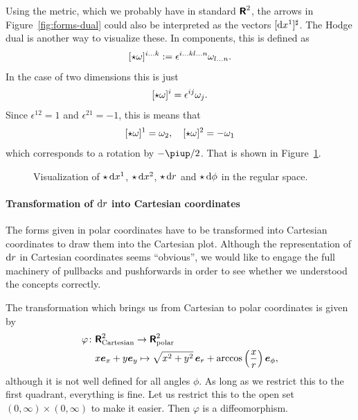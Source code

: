 \documentclass[11pt, english, fleqn, DIV=15, headinclude, BCOR=1cm]{scrartcl}
\begin{document}
Using the metric, which we probably have in standard $\text{\bfseries\sffamily R}^2$, the arrows in
Figure~\ref{fig:forms-dual} could also be interpreted as the vectors $[\mathop{}\!\mathrm d
x^1]^\sharp$. The Hodge dual is another way to visualize these. In components,
this is defined as
\[
    [\star \omega]^{i\ldots k} := \epsilon^{i\ldots kl\ldots n} \omega_{l
    \ldots n}.
\]
In the case of two dimensions this is just
\[
    [\star \omega]^i = \epsilon^{ij} \omega_j.
\]
Since $\epsilon^{12} = 1$ and $\epsilon^{21} = -1$, this is means that
\[
    [\star \omega]^1 = \omega_2
    ,\quad
    [\star \omega]^2 = - \omega_1
\]
which corresponds to a rotation by $-\piup/2$. That is shown in
Figure~\ref{fig:forms}.

\begin{figure}[htbp]
    \centering
    \caption{%
        Visualization of $\star \mathop{}\!\mathrm d x^1$, $\star \mathop{}\!\mathrm d x^2$, $\star \mathop{}\!\mathrm d r$
        and $\star \mathop{}\!\mathrm d \phi$ in the regular space.
    }
    \label{fig:forms}
\end{figure}

\paragraph{Transformation of $\mathop{}\!\mathrm d r$ into Cartesian coordinates}

The forms given in polar coordinates have to be transformed into Cartesian
coordinates to draw them into the Cartesian plot. Although the representation
of $\mathop{}\!\mathrm d r$ in Cartesian coordinates seems “obvious”, we would like to engage
the full machinery of pullbacks and pushforwards in order to see whether we
understood the concepts correctly.

The transformation which brings us from Cartesian to polar coordinates is given
by
\begin{align*}
    \varphi \colon &\text{\bfseries\sffamily R}^2_\text{Cartesian} \to \text{\bfseries\sffamily R}^2_\text{polar} \\
                &x \boldsymbol{e}_x + y \boldsymbol{e}_y \mapsto \sqrt{x^2 + y^2} \, \boldsymbol{e}_r + \arccos\left( \frac xr \right)
    \boldsymbol{e}_\phi,
\end{align*}
although it is not well defined for all angles $\phi$. As long as we restrict
this to the first quadrant, everything is fine. Let us restrict this to the
open set $(0, \infty) \times (0, \infty)$ to make it easier. Then $\varphi$ is
a diffeomorphism.
\end{document}
